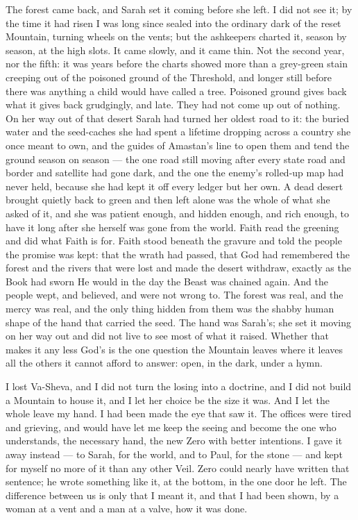 \ornament

The forest came back, and Sarah set it coming before she left. I did not see it; by the time it had risen I was long since sealed into the ordinary dark of the reset Mountain, turning wheels on the vents; but the ashkeepers charted it, season by season, at the high slots. It came slowly, and it came thin. Not the second year, nor the fifth: it was years before the charts showed more than a grey-green stain creeping out of the poisoned ground of the Threshold, and longer still before there was anything a child would have called a tree. Poisoned ground gives back what it gives back grudgingly, and late. They had not come up out of nothing. On her way out of that desert Sarah had turned her oldest road to it: the buried water and the seed-caches she had spent a lifetime dropping across a country she once meant to own, and the guides of Amastan's line to open them and tend the ground season on season --- the one road still moving after every state road and border and satellite had gone dark, and the one the enemy's rolled-up map had never held, because she had kept it off every ledger but her own. A dead desert brought quietly back to green and then left alone was the whole of what she asked of it, and she was patient enough, and hidden enough, and rich enough, to have it long after she herself was gone from the world. Faith read the greening and did what Faith is for. Faith stood beneath the gravure and told the people the promise was kept: that the wrath had passed, that God had remembered the forest and the rivers that were lost and made the desert withdraw, exactly as the Book had sworn He would in the day the Beast was chained again. And the people wept, and believed, and were not wrong to. The forest was real, and the mercy was real, and the only thing hidden from them was the shabby human shape of the hand that carried the seed. The hand was Sarah's; she set it moving on her way out and did not live to see most of what it raised. Whether that makes it any less God's is the one question the Mountain leaves where it leaves all the others it cannot afford to answer: open, in the dark, under a hymn.\par

\ornament

I lost Va-Sheva, and I did not turn the losing into a doctrine, and I did not build a Mountain to house it, and I let her choice be the size it was. And I let the whole leave my hand. I had been made the eye that saw it. The offices were tired and grieving, and would have let me keep the seeing and become the one who understands, the necessary hand, the new Zero with better intentions. I gave it away instead --- to Sarah, for the world, and to Paul, for the stone --- and kept for myself no more of it than any other Veil. Zero could nearly have written that sentence; he wrote something like it, at the bottom, in the one door he left. The difference between us is only that I meant it, and that I had been shown, by a woman at a vent and a man at a valve, how it was done.\par


